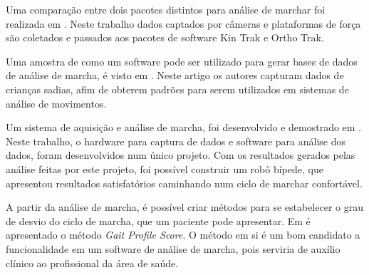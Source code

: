 Uma comparação entre dois pacotes distintos para análise de marchar foi realizada em \cite{Moraes2003}. Neste trabalho dados captados por câmeras e plataformas de força são coletados e passados aos pacotes de software Kin Trak e Ortho Trak.

Uma amostra de como um software pode ser utilizado para gerar bases de dados de análise de marcha, é visto em \cite{Moreno2009}. Neste artigo os autores capturam dados de crianças sadias, afim de obterem padrões para serem utilizados em sistemas de análise de movimentos.

Um sistema de aquisição e análise de marcha, foi desenvolvido e demostrado em \cite{Ferreira2009}. 
Neste trabalho, o hardware para captura de dados e software para análise dos dados, foram desenvolvidos num único projeto.
Com os resultados gerados pelas análise feitas por este projeto, foi possível construir um robô bípede, que apresentou resultados satisfatórios caminhando num ciclo de marchar confortável.

A partir da análise de marcha, é possível criar métodos para se estabelecer o grau de desvio do ciclo de marcha, que um paciente pode apresentar.
Em \cite{Beynon2010} é apresentado o método \emph{Gait Profile Score}.
O método em si é um bom candidato a funcionalidade em um software de análise de marcha, pois serviria de auxílio clínico ao profissional da área de saúde. 


